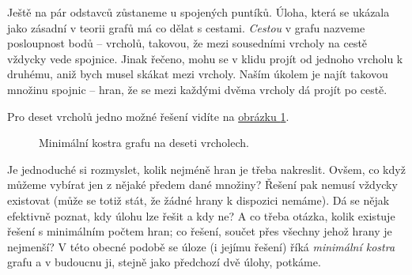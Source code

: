 Ještě na pár odstavců zůstaneme u spojených puntíků. Úloha, která se ukázala
jako zásadní v teorii grafů má co dělat s cestami. \emph{Cestou} v grafu
nazveme posloupnost bodů -- vrcholů, takovou, že mezi sousedními vrcholy na
cestě vždycky vede spojnice. Jinak řečeno, mohu se v klidu projít od jednoho
vrcholu k druhému, aniž bych musel skákat mezi vrcholy. Naším úkolem je najít
takovou množinu spojnic -- hran, že se mezi každými dvěma vrcholy dá projít po
cestě.

Pro deset vrcholů jedno možné řešení vidíte na
\hyperref[fig:minimal-skeleton-on-10-pts]{obrázku
\ref*{fig:minimal-skeleton-on-10-pts}}.

\begin{figure}[h]
 \centering
 \caption{Minimální kostra grafu na deseti vrcholech.}
 \label{fig:minimal-skeleton-on-10-pts}
\end{figure}

Je jednoduché si rozmyslet, kolik nejméně hran je třeba nakreslit. Ovšem, co
když můžeme vybírat jen z nějaké předem dané množiny? Řešení pak nemusí vždycky
existovat (může se totiž stát, že žádné hrany k dispozici nemáme). Dá se nějak
efektivně poznat, kdy úlohu lze řešit a kdy ne? A co třeba otázka, kolik
existuje řešení s minimálním počtem hran; co řešení, součet přes všechny jehož
hrany je nejmenší? V této obecné podobě se úloze (i jejímu řešení) říká
\emph{minimální kostra} grafu a v budoucnu ji, stejně jako předchozí dvě úlohy,
potkáme.

